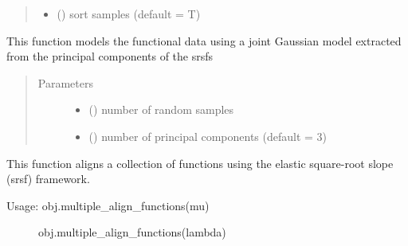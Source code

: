 \documentclass[letterpaper,10pt,english]{sphinxmanual}
\begin{document}
\begin{fulllineitems}
\begin{fulllineitems}
\begin{quote}
\begin{description}
\begin{itemize}
\item {} 
 () \textendash{} sort samples (default = T)

\end{itemize}

\end{description}\end{quote}

\end{fulllineitems}


\begin{fulllineitems}
\label{\detokenize{time_warping:time_warping.fdawarp.joint_gauss_model}}
This function models the functional data using a joint Gaussian model
extracted from the principal components of the srsfs
\begin{quote}\begin{description}
\item[{Parameters}] \leavevmode\begin{itemize}
\item {} 
 () \textendash{} number of random samples

\item {} 
 () \textendash{} number of principal components (default = 3)

\end{itemize}

\end{description}\end{quote}

\end{fulllineitems}


\begin{fulllineitems}
\label{\detokenize{time_warping:time_warping.fdawarp.multiple_align_functions}}
This function aligns a collection of functions using the elastic square-root
slope (srsf) framework.
\begin{description}
\item[{Usage:  obj.multiple\_align\_functions(mu)}] \leavevmode
obj.multiple\_align\_functions(lambda)


\end{description}
\end{fulllineitems}
\end{fulllineitems}
\end{document}
